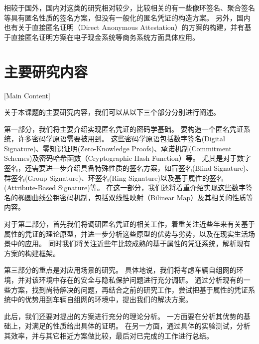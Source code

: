 相较于国外，国内对这类的研究相对较少，比较相关的有一些像环签名、聚合签名等具有匿名性质的签名方案\cite{张严2012匿名凭证方案研究进展,胡江红2017可证明安全的基于证书聚合签名方案}，但没有一般化的匿名凭证的构造方案。
另外，国内也有关于直接匿名证明（Direct Anonymous Attestation）的方案的构建\cite{张严2012匿名凭证方案研究进展}，并有基于直接匿名证明方案在电子现金系统等商务系统方面具体应用\cite{柳欣2016基于DAA-A的改进可授权电子现金系统,柳欣2016基于DAA的轻量级多商家多重息票系统}。

\section{主要研究内容}[Main Content]

关于本课题的主要研究内容，我们可以从以下三个部分分别进行阐述。

第一部分，我们将主要介绍实现匿名凭证的密码学基础。
要构造一个匿名凭证系统，许多密码学原语需要被用到。
这些密码学原语包括数字签名(Digital Signature)、零知识证明(Zero-Knowledge Proofs)、承诺机制(Commitment Schemes)及密码哈希函数（Cryptographic Hash Function）等。
尤其是对于数字签名，还需要进一步介绍具备特殊性质的签名方案，如盲签名(Blind Signature)、群签名(Group Signature)、环签名(Ring Signature)以及基于属性的签名(Attribute-Based Signature)等。
在这一部分，我们还将着重介绍实现这些数字签名的椭圆曲线公钥密码机制，包括双线性映射（Bilinear Map）及其相关的性质等内容。

对于第二部分，首先我们将调研匿名凭证的相关工作，着重关注近些年来有关基于属性的凭证的理论原型，并进一步分析这些原型的优势与劣势，以及在现实生活场景中的应用。
同时我们将关注近些年比较成熟的基于属性的凭证系统，解析现有方案的构建框架。

第三部分的重点是对应用场景的研究。
具体地说，我们将考虑车辆自组网的环境，并对该环境中存在的安全与隐私保护问题进行充分调研。
通过分析现有的一些方案，找到尚待解决的问题，再结合之前的研究工作，尝试把基于属性的凭证系统中的优势用到车辆自组网的环境中，提出我们的解决方案。

此后，我们还要对提出的方案进行充分的理论分析。
一方面要在分析其优势的基础上，对满足的性质给出具体的证明。
在另一方面，通过具体的实验测试，分析其效率，并与其它相近方案做比较，最后对已完成的工作进行总结。
